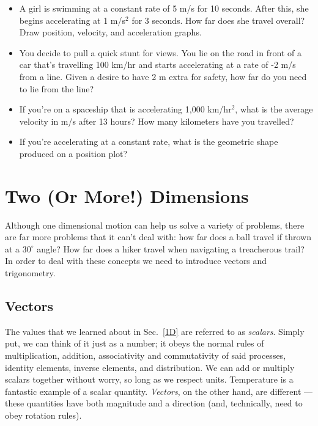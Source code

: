 \documentclass[letterpaper,12pt]{article}
\begin{document}
\begin{itemize}
\item A girl is swimming at a constant rate of 5 m/s for 10 seconds. After this, she begins accelerating at 1 m/s$^2$ for 3 seconds. How far does she travel overall? Draw position, velocity, and acceleration graphs. 

\item You decide to pull a quick stunt for views. You lie on the road in front of a car that's travelling 100 km/hr and starts accelerating at a rate of -2 m/s from a line. Given a desire to have 2 m extra for safety, how far do you need to lie from the line?

\item If you're on a spaceship that is accelerating 1,000 km/hr$^2$, what is the average velocity in m/s after 13 hours? How many kilometers have you travelled?

\item If you're accelerating at a constant rate, what is the geometric shape produced on a position plot?
\end{itemize}

\section{Two (Or More!) Dimensions}\label{2D}

Although one dimensional motion can help us solve a variety of problems, there are far more problems that it can't deal with: how far does a ball travel if thrown at a $30^{\circ}$ angle? How far does a hiker travel when navigating a treacherous trail? In order to deal with these concepts we need to introduce vectors and trigonometry. 

\subsection{Vectors}\label{sec:vectors}

The values that we learned about in Sec.~\ref{1D} are referred to as \textit{scalars}. Simply put, we can think of it just as a number; it obeys the normal rules of multiplication, addition, associativity and commutativity of said processes, identity elements, inverse elements, and distribution. We can add or multiply scalars together without worry, so long as we respect units. Temperature is a fantastic example of a scalar quantity. \textit{Vectors}, on the other hand, are different --- these quantities have both magnitude and a direction (and, technically, need to obey rotation rules). 
\end{document}
